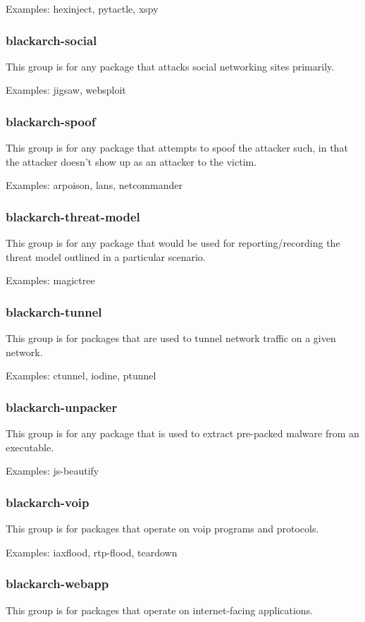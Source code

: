 \documentclass[a4paper, oneside, 11pt]{book}
\begin{document}
Examples: hexinject, pytactle, xspy

\subsubsection{blackarch-social}
This group is for any package that attacks social networking sites primarily.

Examples: jigsaw, websploit

\subsubsection{blackarch-spoof}
This group is for any package that attempts to spoof the attacker such, in that
the attacker doesn't show up as an attacker to the victim.

Examples: arpoison, lans, netcommander

\subsubsection{blackarch-threat-model}
This group is for any package that would be used for reporting/recording the
threat model outlined in a particular scenario.

Examples: magictree

\subsubsection{blackarch-tunnel}
This group is for packages that are used to tunnel network traffic on a given
network.

Examples: ctunnel, iodine, ptunnel

\subsubsection{blackarch-unpacker}
This group is for any package that is used to extract pre-packed malware from an
executable.

Examples: js-beautify

\subsubsection{blackarch-voip}
This group is for packages that operate on voip programs and protocols.

Examples: iaxflood, rtp-flood, teardown

\subsubsection{blackarch-webapp}
This group is for packages that operate on internet-facing applications.
\end{document}
